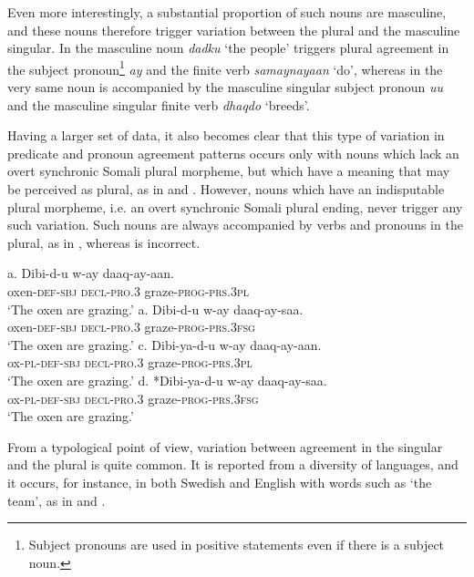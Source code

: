 \documentclass[output=paper]{langsci/langscibook}
\begin{document}
Even more interestingly, a substantial proportion of such nouns are masculine, and these nouns therefore trigger variation between the plural and the masculine singular. In  the masculine noun \textit{dadku} ‘the people’ triggers plural agreement in the subject pronoun\footnote{Subject pronouns are used in positive statements even if there is a subject noun.} \textit{ay} and the finite verb \textit{samaynayaan} ‘do’, whereas in  the very same noun is accompanied by the masculine singular subject pronoun \textit{uu} and the masculine singular finite verb \textit{dhaqdo} ‘breeds’. 

Having a larger set of data, it also becomes clear that this type of variation in predicate and pronoun agreement patterns occurs only with nouns which lack an overt synchronic Somali plural morpheme, but which have a meaning that may be perceived as plural, as in  and . However, nouns which have an indisputable plural morpheme, i.e. an overt synchronic Somali plural ending, never trigger any such variation. Such nouns are always accompanied by verbs and pronouns in the plural, as in , whereas  is incorrect.

\ea
\ea
\gll a. Dibi-d-u     w-ay     daaq-ay-aan.\\
       oxen-\textsc{def-sbj   decl-pro.3}  graze-\textsc{prog-prs.3pl}\\
\glt ‘The oxen are grazing.’
\ex
\gll a. Dibi-d-u    w-ay    daaq-ay-saa.\\
       oxen\textsc{{}-def-sbj  decl-pro.3}  graze-\textsc{prog-prs.3fsg}\\
\glt ‘The oxen are grazing.’
\ex
\gll c. Dibi-ya-d-u    w-ay    daaq-ay-aan.\\
       ox\textsc{{}-pl-def-sbj  decl-pro.3}  graze-\textsc{prog-prs.3pl}\\
\glt ‘The oxen are grazing.’
\ex
\gll d. *Dibi-ya-d-u    w-ay    daaq-ay-saa.\\
       ox\textsc{{}-pl-def-sbj  decl-pro.3}  graze\textsc{{}-prog-prs.3fsg}\\
\glt ‘The oxen are grazing.’
\z
\z

From a typological point of view, variation between agreement in the singular and the plural is quite common. It is reported from a diversity of languages, and it occurs, for instance, in both Swedish and English with words such as ‘the team’, as in  and .
\end{document}
